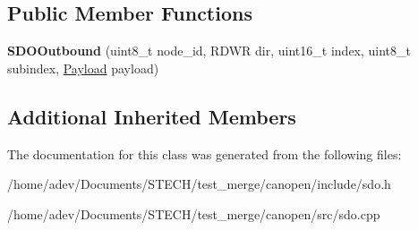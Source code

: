 \subsection*{Public Member Functions}
\begin{DoxyCompactItemize}
\item 
\mbox{\label{class_c_a_nopen_1_1_s_d_o_outbound_ac43a44aaaa9356e3ddab74d008c5a3ca}} 
{\bfseries S\+D\+O\+Outbound} (uint8\+\_\+t node\+\_\+id, R\+D\+WR dir, uint16\+\_\+t index, uint8\+\_\+t subindex, \hyperlink{class_c_a_nopen_1_1_payload}{Payload} payload)
\end{DoxyCompactItemize}
\subsection*{Additional Inherited Members}


The documentation for this class was generated from the following files\+:\begin{DoxyCompactItemize}
\item 
/home/adev/\+Documents/\+S\+T\+E\+C\+H/test\+\_\+merge/canopen/include/sdo.\+h\item 
/home/adev/\+Documents/\+S\+T\+E\+C\+H/test\+\_\+merge/canopen/src/sdo.\+cpp\end{DoxyCompactItemize}
